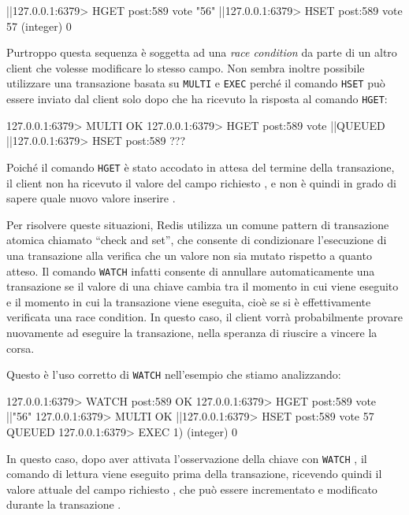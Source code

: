 \begin{commentedsource}[style=redis]
|\lnote|127.0.0.1:6379> HGET post:589 vote
"56"
|\lnote|127.0.0.1:6379> HSET post:589 vote 57
(integer) 0
\end{commentedsource}

Purtroppo questa sequenza è soggetta ad una \emph{race condition} da parte di un altro client che
volesse modificare lo stesso campo. Non sembra inoltre possibile utilizzare una transazione basata
su \verb|MULTI| e \verb|EXEC| perché il comando \verb|HSET| può essere inviato dal client solo dopo
che ha ricevuto la risposta al comando \verb|HGET|:

\begin{commentedsource}[style=redis]
127.0.0.1:6379> MULTI
OK
127.0.0.1:6379> HGET post:589 vote
|\lnote|QUEUED
|\lnote|127.0.0.1:6379> HSET post:589 ???
\end{commentedsource}

Poiché il comando \verb|HGET| è stato accodato in attesa del termine della transazione, il client
non ha ricevuto il valore del campo richiesto , e non è quindi in grado di sapere quale
nuovo valore inserire .

Per risolvere queste situazioni, Redis utilizza un comune pattern di transazione atomica chiamato
``check and set'', che consente di condizionare l'esecuzione di una transazione alla verifica che un
valore non sia mutato rispetto a quanto atteso. Il comando \verb|WATCH| infatti consente di
annullare automaticamente una transazione se il valore di una chiave cambia tra il momento in cui
viene eseguito e il momento in cui la transazione viene eseguita, cioè se si è effettivamente
verificata una race condition. In questo caso, il client vorrà probabilmente provare nuovamente ad
eseguire la transazione, nella speranza di riuscire a vincere la corsa.

Questo è l'uso corretto di \verb|WATCH| nell'esempio che stiamo a\-na\-liz\-zan\-do:

\begin{commentedsource}[style=redis]
127.0.0.1:6379> WATCH post:589
OK
127.0.0.1:6379> HGET post:589 vote
|\lnote|"56"
127.0.0.1:6379> MULTI
OK
|\lnote|127.0.0.1:6379> HSET post:589 vote 57
QUEUED
127.0.0.1:6379> EXEC
1) (integer) 0
\end{commentedsource}

In questo caso, dopo aver attivata l'osservazione della chiave con \verb|WATCH| , il
comando di lettura viene eseguito prima della transazione, ricevendo quindi il valore
attuale del campo richiesto , che può essere incrementato e modificato durante la transazione
.

